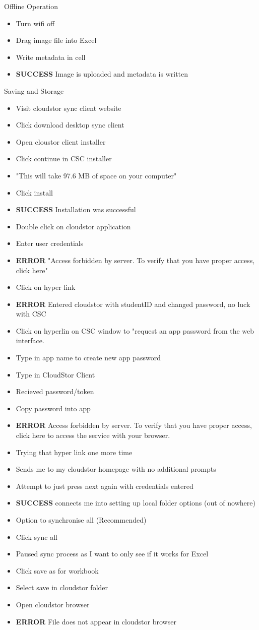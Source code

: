 \documentclass{article}
\begin{document}
Offline Operation
\begin{itemize}
\item Turn wifi off 
\item Drag image file into Excel 
\item Write metadata in cell
\item \textbf{SUCCESS} Image is uploaded and metadata is written
\end{itemize}
Saving and Storage 
\begin{itemize}
\item Visit cloudstor sync client website
\item Click download desktop sync client 
\item Open cloustor client installer
\item Click continue in CSC installer
\item "This will take 97.6 MB of space on your computer"
\item Click install
\item \textbf{SUCCESS} Installation was successful
\item Double click on cloudstor application
\item Enter user credentials 
\item \textbf{ERROR} "Access forbidden by server. To verify that you have proper access, click here"
\item Click on hyper link 
\item \textbf{ERROR} Entered cloudstor with studentID and changed password, no luck with CSC
\item Click on hyperlin on CSC window to "request an app password from the web interface.
\item Type in app name to create new app password
\item Type in CloudStor Client
\item Recieved password/token
\item Copy password into app
\item \textbf{ERROR} Access forbidden by server. To verify that you have proper access, click here to access the service with your browser.
\item Trying that hyper link one more time
\item Sends me to my cloudstor homepage with no additional prompts
\item Attempt to just press next again with credentials entered
\item \textbf{SUCCESS} connects me into setting up local folder options (out of nowhere)
\item Option to synchronise all (Recommended)
\item Click sync all
\item Paused sync process as I want to only see if it works for Excel
\item Click save as for workbook
\item Select save in cloudstor folder
\item Open cloudstor browser
\item \textbf{ERROR} File does not appear in cloudstor browser
\end{itemize}
\end{document}
